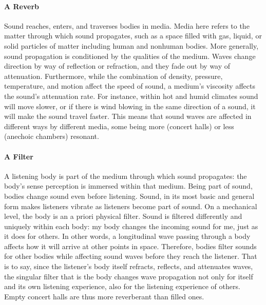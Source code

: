 \paragraph{A Reverb}
Sound reaches, enters, and traverses bodies in media. Media here refers to the matter through which sound propagates, such as a space filled with gas, liquid, or solid particles of matter including human and nonhuman bodies. More generally, sound propagation is conditioned by the qualities of the medium. Waves change direction by way of reflection or refraction, and they fade out by way of attenuation. Furthermore, while the combination of density, pressure, temperature, and motion affect the speed of sound, a medium's viscosity affects the sound's attenuation rate. For instance, within hot and humid climates sound will move slower, or if there is wind blowing in the same direction of a sound, it will make the sound travel faster. This means that sound waves are affected in different ways by different media, some being more (concert halls) or less (anechoic chambers) resonant.

\paragraph{A Filter}
A listening body is part of the medium through which sound propagates: the body's sense perception is immersed within that medium. Being part of sound, bodies change sound even before listening. Sound, in its most basic and general form makes listeners vibrate as listeners become part of sound. On a mechanical level, the body is an a priori physical filter. Sound is filtered differently and uniquely within each body: my body changes the incoming sound for me, just as it does for others. In other words, a longitudinal wave passing through a body affects how it will arrive at other points in space. Therefore, bodies filter sounds for other bodies while affecting sound waves before they reach the listener. That is to say, since the listener's body itself refracts, reflects, and attenuates waves, the singular filter that is the body changes wave propagation not only for itself and its own listening experience, also for the listening experience of others. Empty concert halls are thus more reverberant than filled ones. 

